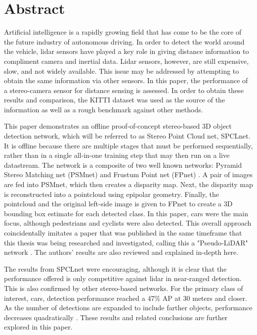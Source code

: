 \section*{Abstract} %

Artificial intelligence is a rapidly growing field that has come to be the core of the future industry of autonomous driving. In order to detect the world around the vehicle, lidar sensors have played a key role in giving distance information to compliment camera and inertial data. Lidar sensors, however, are still expensive, slow, and not widely available. This issue may be addressed by attempting to obtain the same information via other sensors. In this paper, the performance of a stereo-camera sensor for distance sensing is assessed. In order to obtain these results and comparison, the KITTI dataset was used as the source of the information as well as a rough benchmark against other methods. 

This paper demonstrates an offline proof-of-concept stereo-based 3D object detection network, which will be referred to as Stereo Point Cloud net, SPCLnet. It is offline because there are multiple stages that must be performed sequentially, rather than in a single all-in-one training step that may then run on a live datastream. The network is a composite of two well known networks: Pyramid Stereo Matching net (PSMnet) \cite{chang_pyramid_2018} and Frustum Point net (FPnet) \cite{qi_frustum_2017}. A pair of images are fed into PSMnet, which then creates a disparity map. Next, the disparity map is reconstructed into a pointcloud using epipolar geometry. Finally, the pointcloud and the original left-side image is given to FPnet to create a 3D bounding box estimate for each detected class. In this paper, cars were the main focus, although pedestrians and cyclists were also detected. This overall approach coincidentally imitates a paper that was published in the same timeframe that this thesis was being researched and investigated, calling this a "Pseudo-LiDAR" network \cite{wang_pseudo-lidar_2019}. The authors' results are also reviewed and explained in-depth here.

The results from SPCLnet were encouraging, although it is clear that the performance offered is only competitive against lidar in near-ranged detection. This is also confirmed by other stereo-based networks. For the primary class of interest, cars, detection performance reached a 47\% AP at 30 meters and closer. As the number of detections are expanded to include farther objects, performance decreases quadratically \cite{wang_pseudo-lidar_2019}. These results and related conclusions are further explored in this paper.

